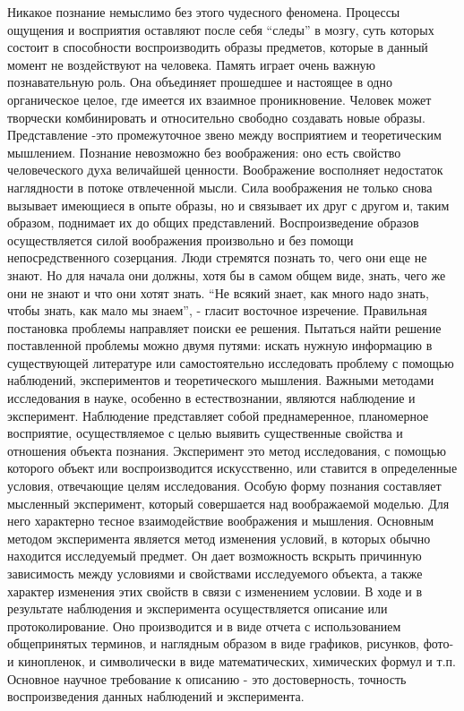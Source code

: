 \documentclass[12pt]{article}
\begin{document}
Никакое познание немыслимо без этого чудесного феномена. Процессы ощущения и восприятия оставляют
после себя “следы” в мозгу, суть которых состоит в способности воспроизводить образы предметов, которые в
данный момент не воздействуют на человека. Память играет очень важную познавательную роль. Она
объединяет прошедшее и настоящее в одно органическое целое, где имеется их взаимное проникновение.
Человек может творчески комбинировать и относительно свободно создавать новые образы. Представление -это промежуточное звено между восприятием и теоретическим мышлением. Познание невозможно без
воображения: оно есть свойство человеческого духа величайшей ценности. Воображение восполняет
недостаток наглядности в потоке отвлеченной мысли. Сила воображения не только снова вызывает имеющиеся
в опыте образы, но и связывает их друг с другом и, таким образом, поднимает их до общих представлений.
Воспроизведение образов осуществляется силой воображения произвольно и без помощи непосредственного
созерцания.
Люди стремятся познать то, чего они еще не знают. Но для начала они должны, хотя бы в самом общем виде,
знать, чего же они не знают и что они хотят знать. “Не всякий знает, как много надо знать, чтобы знать, как мало
мы знаем”, - гласит восточное изречение.
Правильная постановка проблемы направляет поиски ее решения. Пытаться найти решение поставленной
проблемы можно двумя путями: искать нужную информацию в существующей литературе или самостоятельно
исследовать проблему с помощью наблюдений, экспериментов и теоретического мышления.
Важными методами исследования в науке, особенно в естествознании, являются наблюдение и эксперимент.
Наблюдение представляет собой преднамеренное, планомерное восприятие, осуществляемое с целью выявить
существенные свойства и отношения объекта познания. Эксперимент это метод исследования, с помощью
которого объект или воспроизводится искусственно, или ставится в определенные условия, отвечающие целям
исследования. Особую форму познания составляет мысленный эксперимент, который совершается над
воображаемой моделью. Для него характерно тесное взаимодействие воображения и мышления. Основным
методом эксперимента является метод изменения условий, в которых обычно находится исследуемый предмет.
Он дает возможность вскрыть причинную зависимость между условиями и свойствами исследуемого объекта, а
также характер изменения этих свойств в связи с изменением условии.
В ходе и в результате наблюдения и эксперимента осуществляется описание или протоколирование. Оно
производится и в виде отчета с использованием общепринятых терминов, и наглядным образом в виде
графиков, рисунков, фото- и кинопленок, и символически в виде математических, химических формул и т.п.
Основное научное требование к описанию - это достоверность, точность воспроизведения данных наблюдений
и эксперимента. 
\end{document}
